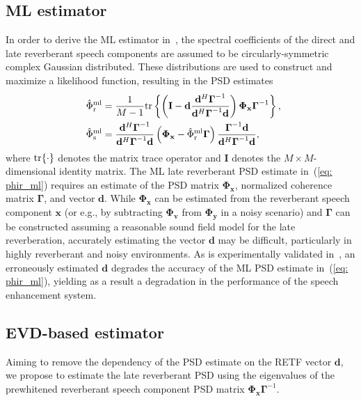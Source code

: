 \documentclass[10pt]{IEEEtran}
\begin{document}
\subsection{ML estimator}
In order to derive the ML estimator in~\cite{Kuklasinski_EUSIPCO_2014g}, the spectral coefficients of the direct and late reverberant speech  components are assumed to be circularly-symmetric complex Gaussian distributed.
These distributions are used to construct and maximize a likelihood function, resulting in the PSD estimates
\begin{subequations}
\label{eq: psd_ml}
\begin{align}
\label{eq: phir_ml}
\!\!\!\!\hat{\Phi}_{\rm r}^{\rm ml} & = \frac{1}{M-1} {\rm tr} \left\{  \left( \mathbf{I} - \mathbf{d} \frac{\mathbf{d}^{H}\boldsymbol{\Gamma}^{-1}}{\mathbf{d}^H\boldsymbol{\Gamma}^{-1}\mathbf{d}} \right) \boldsymbol{\Phi}_{\mathbf{x}}\boldsymbol{\Gamma}^{-1}\right\},\!\!\! \\
\hat{\Phi}_{\rm s}^{\rm ml} & = \frac{\mathbf{d}^{H}\boldsymbol{\Gamma}^{-1}}{\mathbf{d}^H\boldsymbol{\Gamma}^{-1}\mathbf{d}} \left( \boldsymbol{\Phi}_{\mathbf{x}} - \hat{\Phi}_{\rm r}^{\rm ml} \boldsymbol{\Gamma} \right) \frac{\boldsymbol{\Gamma}^{-1}\mathbf{d}}{\mathbf{d}^H\boldsymbol{\Gamma}^{-1}\mathbf{d}},
\end{align}
\end{subequations}
where ${\rm tr}\{ \cdot \}$ denotes the matrix trace operator and $\mathbf{I}$ denotes the $M \times M$-dimensional identity matrix.
The ML late reverberant PSD estimate in~(\ref{eq: phir_ml}) requires an estimate of the PSD matrix $\boldsymbol{\Phi}_{\mathbf{x}}$, normalized coherence matrix $\boldsymbol{\Gamma}$, and vector $\mathbf{d}$.
While $\boldsymbol{\Phi}_{\mathbf{x}}$ can be estimated from the reverberant speech component $\mathbf{x}$ (or e.g., by subtracting $\mathbf{\Phi}_{\mathbf{v}}$ from $\mathbf{\Phi}_{\mathbf{y}}$ in a noisy scenario) and $\boldsymbol{\Gamma}$ can be constructed assuming a reasonable sound field model for the late reverberation, accurately estimating the vector $\mathbf{d}$ may be difficult, particularly in highly reverberant and noisy environments.
As is experimentally validated in~\cite{kuklasinski_AES_2016}, an erroneously estimated $\mathbf{d}$ degrades the accuracy of the ML PSD estimate in~(\ref{eq: phir_ml}), yielding as a result a degradation in the performance of the speech enhancement system.

\subsection{EVD-based estimator}
\label{sec: evd_psd}
Aiming to remove the dependency of the PSD estimate on the RETF vector $\mathbf{d}$, we propose to estimate the late reverberant PSD using the eigenvalues of the prewhitened reverberant speech component PSD matrix $\boldsymbol{\Phi}_{\mathbf{x}}\boldsymbol{\Gamma}^{-1}$.
\end{document}

